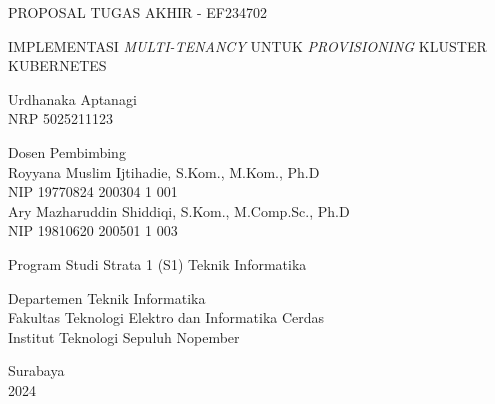 \begin{large}
  PROPOSAL TUGAS AKHIR - EF234702
\end{large}

\vspace{\fill}

\begin{spacing}{1.5}
  \begin{Large}
    IMPLEMENTASI \emph{MULTI-TENANCY} UNTUK
    \emph{PROVISIONING} KLUSTER KUBERNETES 
  \end{Large}
\end{spacing}

\vspace{\fill}

\begin{large}
  Urdhanaka Aptanagi \\
  \textmd{NRP 5025211123}
\end{large}

\vspace{\fill}

\begin{large}
  \textmd{Dosen Pembimbing} \\
  Royyana Muslim Ijtihadie, S.Kom., M.Kom., Ph.D \\
  \textmd{NIP 19770824 200304 1 001} \\
  Ary Mazharuddin Shiddiqi, S.Kom., M.Comp.Sc., Ph.D \\
  \textmd{NIP 19810620 200501 1 003}
\end{large}

\vspace{\fill}

Program Studi Strata 1 (S1) Teknik Informatika \\

\mdseries

Departemen Teknik Informatika \\
Fakultas Teknologi Elektro dan Informatika Cerdas \\
Institut Teknologi Sepuluh Nopember

Surabaya \\
2024
